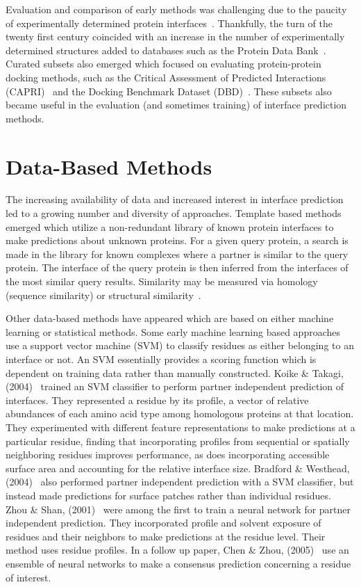 Evaluation and comparison of early methods was challenging due to the paucity of experimentally determined protein interfaces~\cite{esmaielbeiki2015}.
Thankfully, the turn of the twenty first century coincided with an increase in the number of experimentally determined structures added to databases such as the Protein Data Bank~\cite{berman2000}.
Curated subsets also emerged which focused on evaluating protein-protein docking methods, such as the Critical Assessment of Predicted Interactions (CAPRI)~\cite{janin2003} and the Docking Benchmark Dataset (DBD)~\cite{chen2002}.
These subsets also became useful in the evaluation (and sometimes training) of interface prediction methods.

\section{Data-Based Methods}
	
The increasing availability of data and increased interest in interface prediction led to a growing number and diversity of approaches.
Template based methods emerged which utilize a non-redundant library of known protein interfaces to make predictions about unknown proteins.
For a given query protein, a search is made in the library for known complexes where a partner is similar to the query protein.
The interface of the query protein is then inferred from the interfaces of the most similar query results.
Similarity may be measured via homology (sequence similarity) or structural similarity~\cite{esmaielbeiki2015}.

Other data-based methods have appeared which are based on either machine learning or statistical methods.
Some early machine learning based approaches use a support vector machine (SVM) to classify residues as either belonging to an interface or not.
An SVM essentially provides a scoring function which is dependent on training data rather than manually constructed.
Koike \& Takagi, (2004)~\cite{koike2004} trained an SVM classifier to perform partner independent prediction of interfaces.
They represented a residue by its profile, a vector of relative abundances of each amino acid type among homologous proteins at that location.
They experimented with different feature representations to make predictions at a particular residue, finding that incorporating profiles from sequential or spatially neighboring residues improves performance, as does incorporating accessible surface area and accounting for the relative interface size.
Bradford \& Westhead, (2004)~\cite{bradford2004} also performed partner independent prediction with a SVM classifier, but instead made predictions for surface patches rather than individual residues.
Zhou \& Shan, (2001)~\cite{zhou2001} were among the first to train a neural network for partner independent prediction.
They incorporated profile and solvent exposure of residues and their neighbors to make predictions at the residue level.
Their method uses residue profiles.
In a follow up paper, Chen \& Zhou, (2005)~\cite{chen2005} use an ensemble of neural networks to make a consensus prediction concerning a residue of interest.

